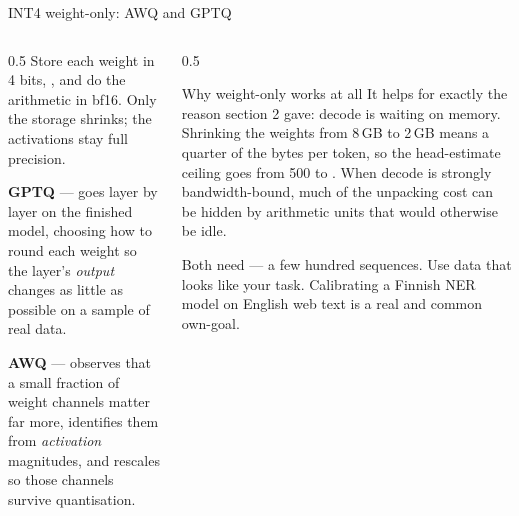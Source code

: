 \documentclass[aspectratio=169,10pt]{beamer}
\begin{document}
\begin{frame}[shrink=3]{INT4 weight-only: AWQ and GPTQ}
  \begin{columns}[T]
    \begin{column}{0.5\textwidth}
      Store each weight in 4 bits, , and do the arithmetic in bf16. Only the storage
      shrinks; the activations stay full precision.
      \vspace{0.6em}

      \textbf{GPTQ} --- goes layer by layer on the finished model, choosing how
      to round each weight so the layer's \emph{output} changes as little as
      possible on a sample of real data.
      \vspace{0.5em}

      \textbf{AWQ} --- observes that a small fraction of weight channels matter
      far more, identifies them from \emph{activation} magnitudes, and rescales
      so those channels survive quantisation.
    \end{column}
    \begin{column}{0.5\textwidth}
      \begin{block}{Why weight-only works at all}
        \small
        It helps for exactly the reason section 2 gave: decode is waiting on
        memory. Shrinking the weights from 8\,GB to 2\,GB means a quarter of
        the bytes per token, so the head-estimate ceiling goes from 500 to
        .
        \vspace{0.3em}
        When decode is strongly bandwidth-bound, much of the unpacking cost
        can be hidden by arithmetic units that would otherwise be idle.
      \end{block}
      \vspace{0.2em}
      \small
      Both need  --- a few hundred sequences. Use data
      that looks like your task. Calibrating a Finnish NER model on English
      web text is a real and common own-goal.
    \end{column}
  \end{columns}
\end{frame}
\end{document}
